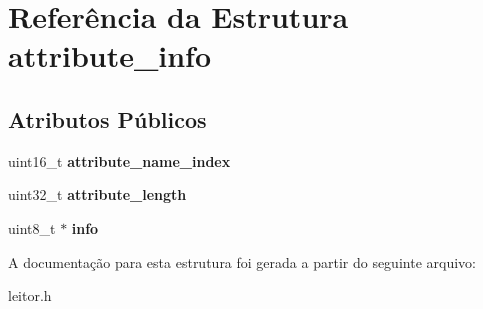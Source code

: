 \hypertarget{structattribute__info}{\section{Referência da Estrutura attribute\-\_\-info}
\label{structattribute__info}
}
\subsection*{Atributos Públicos}
\begin{DoxyCompactItemize}
\item 
\hypertarget{structattribute__info_aa8d580cb4c1e585270a11167bfdec6ff}{uint16\-\_\-t {\bfseries attribute\-\_\-name\-\_\-index}}\label{structattribute__info_aa8d580cb4c1e585270a11167bfdec6ff}

\item 
\hypertarget{structattribute__info_a05bf4c6510e85d1adb7d75c2742b8550}{uint32\-\_\-t {\bfseries attribute\-\_\-length}}\label{structattribute__info_a05bf4c6510e85d1adb7d75c2742b8550}

\item 
\hypertarget{structattribute__info_a1e8b40a1db6e73ac2853a691d9a7a701}{uint8\-\_\-t $\ast$ {\bfseries info}}\label{structattribute__info_a1e8b40a1db6e73ac2853a691d9a7a701}

\end{DoxyCompactItemize}


A documentação para esta estrutura foi gerada a partir do seguinte arquivo\-:\begin{DoxyCompactItemize}
\item 
leitor.\-h\end{DoxyCompactItemize}

